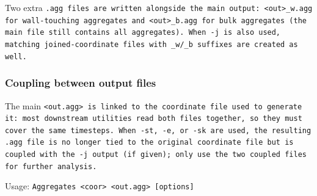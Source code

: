 Two extra \tt{.agg} files are written alongside the main output:
\tt{<out>_w.agg} for wall-touching aggregates and \tt{<out>_b.agg} for bulk
aggregates (the main file still contains all aggregates). When \tt{-j} is also
used, matching joined-coordinate files with \tt{_w}/\tt{_b} suffixes are
created as well.

\subsubsection*{Coupling between output files}

The main \tt{<out.agg>} is linked to the coordinate file used to generate it:
most downstream utilities read both files together, so they must cover the same
timesteps. When \tt{-st}, \tt{-e}, or \tt{-sk} are used, the resulting
\tt{.agg} file is no longer tied to the original coordinate file but is coupled
with the \tt{-j} output (if given); only use the two coupled files for further
analysis.

\vspace{1em}
\noindent
Usage: \tt{Aggregates <coor> <out.agg> [options]}

